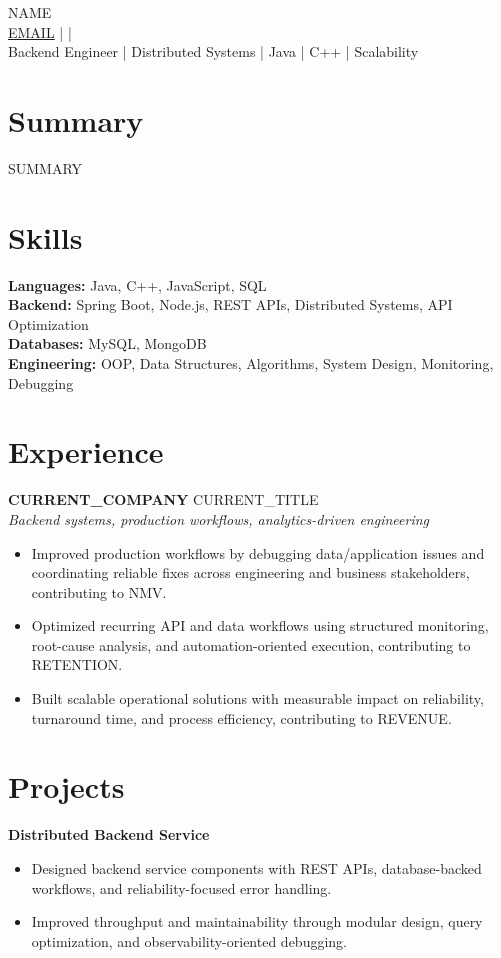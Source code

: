 \documentclass[10pt]{article}
\begin{document}
\begin{center}
{\Large {{NAME}}}\\
\href{mailto:{{EMAIL}}}{{{EMAIL}}} \quad |  \quad | \\
Backend Engineer | Distributed Systems | Java | C++ | Scalability
\end{center}

\section*{Summary}
{{SUMMARY}}

\section*{Skills}
\textbf{Languages:} Java, C++, JavaScript, SQL\\
\textbf{Backend:} Spring Boot, Node.js, REST APIs, Distributed Systems, API Optimization\\
\textbf{Databases:} MySQL, MongoDB\\
\textbf{Engineering:} OOP, Data Structures, Algorithms, System Design, Monitoring, Debugging

\section*{Experience}
\textbf{{{CURRENT_COMPANY}}} \hfill {{CURRENT_TITLE}}\\
\textit{Backend systems, production workflows, analytics-driven engineering}\\
\begin{itemize}
\item Improved production workflows by debugging data/application issues and coordinating reliable fixes across engineering and business stakeholders, contributing to {{NMV}}.
\item Optimized recurring API and data workflows using structured monitoring, root-cause analysis, and automation-oriented execution, contributing to {{RETENTION}}.
\item Built scalable operational solutions with measurable impact on reliability, turnaround time, and process efficiency, contributing to {{REVENUE}}.
\end{itemize}

\section*{Projects}
\textbf{Distributed Backend Service}\\
\begin{itemize}
\item Designed backend service components with REST APIs, database-backed workflows, and reliability-focused error handling.
\item Improved throughput and maintainability through modular design, query optimization, and observability-oriented debugging.
\end{itemize}
\end{document}
